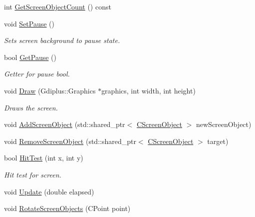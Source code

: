 \begin{DoxyCompactItemize}
\item 
int \mbox{\hyperlink{class_c_screen_aaf50096762a0d8cd83b89637d8be7147}{Get\+Screen\+Object\+Count}} () const
\item 
\mbox{\label{class_c_screen_a85e91bd50b59620f4ef888f096e2cf36}} 
void \mbox{\hyperlink{class_c_screen_a85e91bd50b59620f4ef888f096e2cf36}{Set\+Pause}} ()
\begin{DoxyCompactList}\small\item\em Sets screen background to pause state. \end{DoxyCompactList}\item 
\mbox{\label{class_c_screen_afa4e0ec5258a2481d6448e8efef70616}} 
bool \mbox{\hyperlink{class_c_screen_afa4e0ec5258a2481d6448e8efef70616}{Get\+Pause}} ()
\begin{DoxyCompactList}\small\item\em Getter for pause bool. \end{DoxyCompactList}\item 
void \mbox{\hyperlink{class_c_screen_a1ccd1275b0225982e2a86034425fc95c}{Draw}} (Gdiplus\+::\+Graphics $\ast$graphics, int width, int height)
\begin{DoxyCompactList}\small\item\em Draws the screen. \end{DoxyCompactList}\item 
void \mbox{\hyperlink{class_c_screen_a12ada444c474754438b99d1a39bb5c70}{Add\+Screen\+Object}} (std\+::shared\+\_\+ptr$<$ \mbox{\hyperlink{class_c_screen_object}{C\+Screen\+Object}} $>$ new\+Screen\+Object)
\item 
void \mbox{\hyperlink{class_c_screen_a5418c3a3041dfbd8afad9ddb28ad5cd8}{Remove\+Screen\+Object}} (std\+::shared\+\_\+ptr$<$ \mbox{\hyperlink{class_c_screen_object}{C\+Screen\+Object}} $>$ target)
\item 
bool \mbox{\hyperlink{class_c_screen_aede27a1651d308fa5c75d62266146225}{Hit\+Test}} (int x, int y)
\begin{DoxyCompactList}\small\item\em Hit test for screen. \end{DoxyCompactList}\item 
void \mbox{\hyperlink{class_c_screen_abb87ac8a63d45684c7ad6e4410be7583}{Update}} (double elapsed)
\item 
void \mbox{\hyperlink{class_c_screen_a9eeb298494ea922c2a803f09a4933935}{Rotate\+Screen\+Objects}} (C\+Point point)

\end{DoxyCompactItemize}

